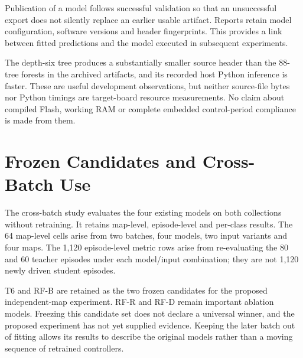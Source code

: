 Publication of a model follows successful validation so that an unsuccessful
export does not silently replace an earlier usable artifact. Reports retain
model configuration, software versions and header fingerprints. This provides
a link between fitted predictions and the model executed in subsequent
experiments.

The depth-six tree produces a substantially smaller source header than the
88-tree forests in the archived artifacts, and its recorded host Python
inference is faster. These are useful development observations, but neither
source-file bytes nor Python timings are target-board resource measurements.
No claim about compiled Flash, working RAM or complete embedded control-period
compliance is made from them.

\section{Frozen Candidates and Cross-Batch Use}
The cross-batch study evaluates the four existing models on both collections
without retraining. It retains map-level, episode-level and per-class results.
The 64 map-level cells arise from two batches, four models, two input variants
and four maps. The 1,120 episode-level metric rows arise from re-evaluating the
80 and 60 teacher episodes under each model/input combination; they are not
1,120 newly driven student episodes.

T6 and RF-B are retained as the two frozen candidates for the proposed
independent-map experiment. RF-R and RF-D remain important ablation models.
Freezing this candidate set does not declare a universal winner, and the
proposed experiment has not yet supplied evidence. Keeping the later batch
out of fitting allows its results to describe the original models rather
than a moving sequence of retrained controllers.
